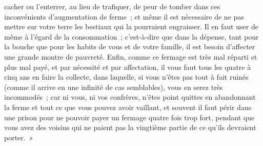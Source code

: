 \documentclass[french,twoside]{book} %
\begin{document}
cacher ou l’enterrer, au lieu de trafiquer, de peur de tomber dans ces inconvénients d’augmentation de ferme ; et même il est nécessaire de ne pas mettre sur votre terre les bestiaux qui la pourraient engraisser. Il en faut user de même à l’égard de la consommation ; c’est-à-dire que dans la dépense, tant pour la bouche que pour les habits de vous et de votre famille, il est besoin d’affecter une grande montre de pauvreté. Enfin, comme ce fermage est très mal réparti et plus mal payé, et par nécessité et par affectation, il vous faut tous les quatre à cinq ans en faire la collecte, dans laquelle, si vous n’êtes pas tout à fait ruinés (comme il arrive en une infinité de cas semblables), vous en serez très incommodés ; car ni vous, ni vos confrères, n’êtes point quittes en abandonnant la ferme et tout ce que vous pouvez avoir vaillant, et souvent il faut périr dans une prison pour ne pouvoir payer un fermage quatre fois trop fort, pendant que vous avez des voisins qui ne paient pas la vingtième partie de ce qu’ils devraient porter. »\par
\end{document}

